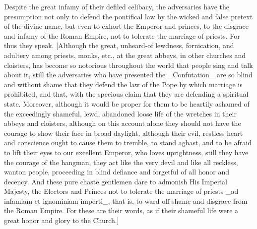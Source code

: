 Despite the great infamy of their defiled celibacy, the adversaries
have the presumption not only to defend the pontifical law by the
wicked and false pretext of the divine name, but even to exhort the
Emperor and princes, to the disgrace and infamy of the Roman Empire,
not to tolerate the marriage of priests.  For thus they speak.
[Although the great, unheard-of lewdness, fornication, and adultery
among priests, monks, etc., at the great abbeys, in other churches
and cloisters, has become so notorious throughout the world that
people sing and talk about it, still the adversaries who have
presented the _Confutation_ are so blind and without shame that they
defend the law of the Pope by which marriage is prohibited, and that,
with the specious claim that they are defending a spiritual state.
Moreover, although it would be proper for them to be heartily ashamed
of the exceedingly shameful, lewd, abandoned loose life of the
wretches in their abbeys and cloisters, although on this account
alone they should not have the courage to show their face in broad
daylight, although their evil, restless heart and conscience ought to
cause them to tremble, to stand aghast, and to be afraid to lift
their eyes to our excellent Emperor, who loves uprightness, still
they have the courage of the hangman, they act like the very devil
and like all reckless, wanton people, proceeding in blind defiance
and forgetful of all honor and decency.  And these pure chaste
gentlemen dare to admonish His Imperial Majesty, the Electors and
Princes not to tolerate the marriage of priests _ad infamiam et
ignominiam imperti_, that is, to ward off shame and disgrace from the
Roman Empire.  For these are their words, as if their shameful life
were a great honor and glory to the Church.]

